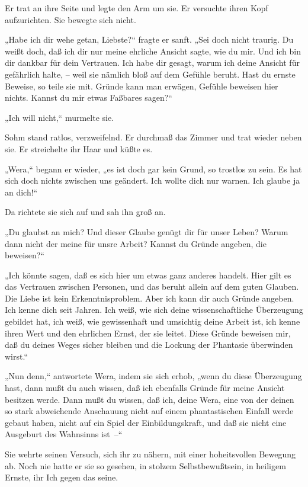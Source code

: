 Er trat an ihre Seite und legte den Arm um sie. Er versuchte ihren
Kopf aufzurichten. Sie bewegte sich nicht.

„Habe ich dir wehe getan, Liebste?“ fragte er sanft. „Sei doch
nicht traurig. Du weißt doch, daß ich dir nur meine ehrliche
Ansicht sagte, wie du mir. Und ich bin dir dankbar für dein
Vertrauen. Ich habe dir gesagt, warum ich deine Ansicht für
gefährlich halte, – weil sie nämlich bloß auf dem Gefühle beruht.
Hast du ernste Beweise, so teile sie mit. Gründe kann man erwägen,
Gefühle beweisen hier nichts. Kannst du mir etwas Faßbares sagen?“

„Ich will nicht,“ murmelte sie.

Sohm stand ratlos, verzweifelnd. Er durchmaß das Zimmer und trat
wieder neben sie. Er streichelte ihr Haar und küßte es.

„Wera,“ begann er wieder, „es ist doch gar kein Grund, so trostlos
zu sein. Es hat sich doch nichts zwischen uns geändert. Ich wollte
dich nur warnen. Ich glaube ja an dich!“

Da richtete sie sich auf und sah ihn groß an.

„Du glaubst an mich? Und dieser Glaube genügt dir für unser Leben?
Warum dann nicht der meine für unsre Arbeit? Kannst du Gründe
angeben, die beweisen?“

„Ich könnte sagen, daß es sich hier um etwas ganz anderes handelt.
Hier gilt es das Vertrauen zwischen Personen, und das beruht allein
auf dem guten Glauben. Die Liebe ist kein Erkenntnisproblem. Aber
ich kann dir auch Gründe angeben. Ich kenne dich seit Jahren. Ich
weiß, wie sich deine wissenschaftliche Überzeugung gebildet hat,
ich weiß, wie gewissenhaft und umsichtig deine Arbeit ist, ich
kenne ihren Wert und den ehrlichen Ernst, der sie leitet. Diese
Gründe beweisen mir, daß du deines Weges sicher bleiben und die
Lockung der Phantasie überwinden wirst.“

„Nun denn,“ antwortete Wera, indem sie sich erhob, „wenn du diese
Überzeugung hast, dann mußt du auch wissen, daß ich ebenfalls
Gründe für meine Ansicht besitzen werde. Dann mußt du wissen, daß
ich, deine Wera, eine von der deinen so stark abweichende
Anschauung nicht auf einem phantastischen Einfall werde gebaut
haben, nicht auf ein Spiel der Einbildungskraft, und daß sie nicht
eine Ausgeburt des Wahnsinns ist~–“

Sie wehrte seinen Versuch, sich ihr zu nähern, mit einer
hoheitsvollen Bewegung ab. Noch nie hatte er sie so gesehen, in
stolzem Selbstbewußtsein, in heiligem Ernste, ihr Ich gegen das
seine.

